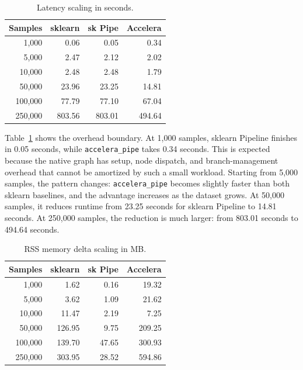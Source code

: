\documentclass[12pt,a4paper,oneside]{report}
\newcommand{\besttime}{\cellcolor{green!20}}
\newcommand{\bestmem}{\cellcolor{blue!15}}
\begin{document}
\begin{table}[!htbp]
\centering
\caption{Latency scaling in seconds.}
\label{tab:latency-scaling}
\normalsize
\renewcommand{\arraystretch}{1.05}
\setlength{\tabcolsep}{4pt}
\begin{tabular}{rrrr}
\toprule
Samples & sklearn & sk Pipe & Accelera \\
\midrule
1{,}000 & 0.06 & \besttime 0.05 & 0.34 \\
5{,}000 & 2.47 & 2.12 & \besttime 2.02 \\
10{,}000 & 2.48 & 2.48 & \besttime 1.79 \\
50{,}000 & 23.96 & 23.25 & \besttime 14.81 \\
100{,}000 & 77.79 & 77.10 & \besttime 67.04 \\
250{,}000 & 803.56 & 803.01 & \besttime 494.64 \\
\bottomrule
\end{tabular}
\end{table}

Table~\ref{tab:latency-scaling} shows the overhead boundary. At 1,000 samples, sklearn Pipeline finishes in 0.05 seconds, while \texttt{accelera\_pipe} takes 0.34 seconds. This is expected because the native graph has setup, node dispatch, and branch-management overhead that cannot be amortized by such a small workload. Starting from 5,000 samples, the pattern changes: \texttt{accelera\_pipe} becomes slightly faster than both sklearn baselines, and the advantage increases as the dataset grows. At 50,000 samples, it reduces runtime from 23.25 seconds for sklearn Pipeline to 14.81 seconds. At 250,000 samples, the reduction is much larger: from 803.01 seconds to 494.64 seconds.

\begin{table}[!htbp]
\centering
\caption{RSS memory delta scaling in MB.}
\label{tab:memory-scaling}
\normalsize
\renewcommand{\arraystretch}{1.05}
\setlength{\tabcolsep}{4pt}
\begin{tabular}{rrrr}
\toprule
Samples & sklearn & sk Pipe & Accelera \\
\midrule
1{,}000 & 1.62 & \bestmem 0.16 & 19.32 \\
5{,}000 & 3.62 & \bestmem 1.09 & 21.62 \\
10{,}000 & 11.47 & \bestmem 2.19 & 7.25 \\
50{,}000 & 126.95 & \bestmem 9.75 & 209.25 \\
100{,}000 & 139.70 & \bestmem 47.65 & 300.93 \\
250{,}000 & 303.95 & \bestmem 28.52 & 594.86 \\
\bottomrule
\end{tabular}
\end{table}
\end{document}

